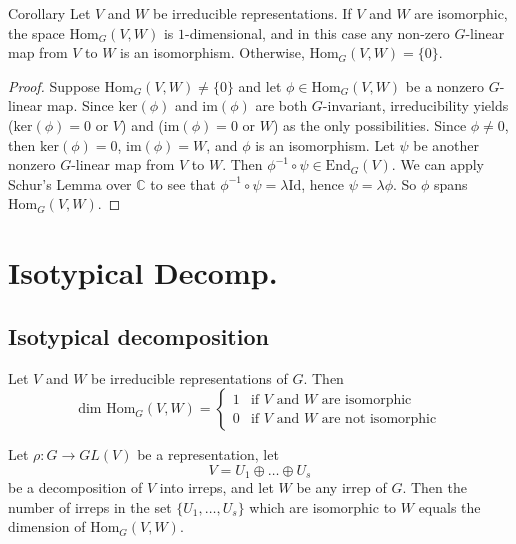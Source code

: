 \begin{frame}
\begin{block}{Corollary}
Let $V$ and $W$ be irreducible representations. If $V$ and $W$ are isomorphic, the space $\text{Hom}_G(V,W)$ is $1$-dimensional, and in this case any non-zero $G$-linear map from $V$ to $W$ is an isomorphism. Otherwise,  $\text{Hom}_G(V,W)=\{0\}$.
\end{block}
\begin{proof}
Suppose  $\text{Hom}_G(V,W) \neq \{0\}$ and let $\phi \in \text{Hom}_G(V,W)$ be a nonzero $G$-linear map. Since $\text{ker}(\phi)$ and $\text{im}(\phi)$ are both $G$-invariant, irreducibility yields ($\text{ker}(\phi) = 0$ or $V$) and ($\text{im}(\phi) = 0$ or $W$) as the only possibilities.  Since $\phi \neq 0$, then $\text{ker}(\phi)=0$, $\text{im}(\phi)=W$, and $\phi$ is an isomorphism.  
Let $\psi$ be another nonzero $G$-linear map from $V$ to $W$.  Then $\phi ^{-1} \circ \psi \in \text{End}_G (V)$.  We can apply Schur's Lemma over $\mathbb{C}$ to see that $\phi ^{-1} \circ \psi = \lambda \text{Id}$, hence $\psi = \lambda \phi$.  So $\phi$ spans $\text{Hom}_G(V,W)$.
\end{proof}
\end{frame}

\section{Isotypical Decomp.}
\subsection{Isotypical decomposition}
\begin{frame}
\begin{proposition}
Let $V$ and $W$ be irreducible representations of $G$.  Then
\[ \text{dim Hom}_G (V,W) =  \begin{cases} 
1 & \mbox{if $V$ and $W$ are isomorphic}  \\
0 &\mbox{if $V$ and $W$ are not isomorphic}
\end{cases} \]
\end{proposition}
\end{frame}

\begin{frame}
\begin{proposition}
Let $\rho \colon G \to GL(V)$ be a representation, let \[ V = U_1 \oplus \ldots \oplus U_s \] be a decomposition of $V$ into irreps, and let $W$ be any irrep of $G$.  Then the number of irreps in the set  $ \{ U_1, \ldots, U_s \}$ which are isomorphic to $W$ equals the dimension of $\text{Hom}_G(V,W)$.
\end{proposition}
\end{frame}


